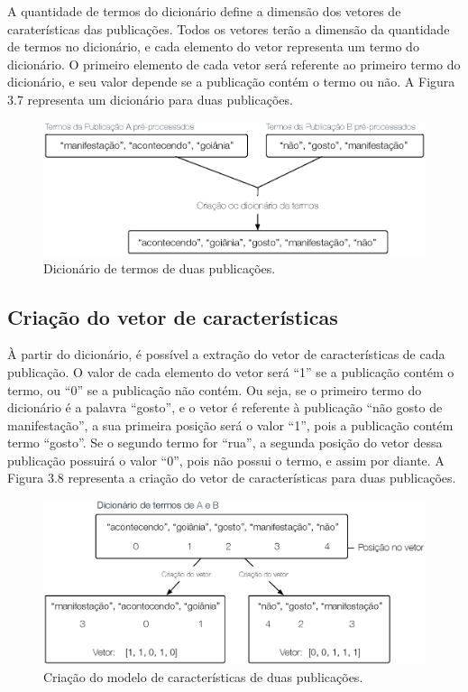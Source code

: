 A quantidade de termos do dicionário define a dimensão dos vetores de caraterísticas das publicações. Todos os vetores terão a dimensão da quantidade de termos no dicionário, e cada elemento do vetor representa um termo do dicionário. O primeiro elemento de cada vetor será referente ao primeiro termo do dicionário, e seu valor depende se a publicação contém o termo ou não. A Figura 3.7 representa um dicionário para duas publicações.

\begin{figure}[htpb]
	\begin{center}
		\includegraphics[width=1.0\textwidth]{figuras/dicionario-termos.eps}
		\caption{Dicionário de termos de duas publicações.}
	\end{center}
\end{figure}

\subsection{Criação do vetor de características}

À partir do dicionário, é possível a extração do vetor de características de cada publicação. O valor de cada elemento do vetor será ``1'' se a publicação contém o termo, ou ``0'' se a publicação não contém. Ou seja, se o primeiro termo do dicionário é a palavra ``gosto'', e o vetor é referente à publicação ``não gosto de manifestação'', a sua primeira posição será o valor ``1'', pois a publicação contém termo ``gosto''. Se o segundo termo for ``rua'', a segunda posição do vetor dessa publicação possuirá o valor ``0'', pois não possui o termo, e assim por diante. A Figura 3.8 representa a criação do vetor de características para duas publicações.

\begin{figure}[htpb]
	\begin{center}
		\includegraphics[width=1.0\textwidth]{figuras/vetor-caracteristicas.eps}
		\caption{Criação do modelo de características de duas publicações.}
	\end{center}
\end{figure}

